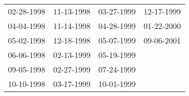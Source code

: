 \begin{supertabular}{llll}
 02-28-1998 &  11-13-1998 &  03-27-1999 &  12-17-1999 \\
 04-04-1998 &  11-14-1998 &  04-28-1999 &  01-22-2000 \\
 05-02-1998 &  12-18-1998 &  05-07-1999 &  09-06-2001 \\
 06-06-1998 &  02-13-1999 &  05-19-1999 &             \\
 09-05-1998 &  02-27-1999 &  07-24-1999 &             \\
 10-10-1998 &  03-17-1999 &  10-01-1999 &             \\
\end{supertabular}
